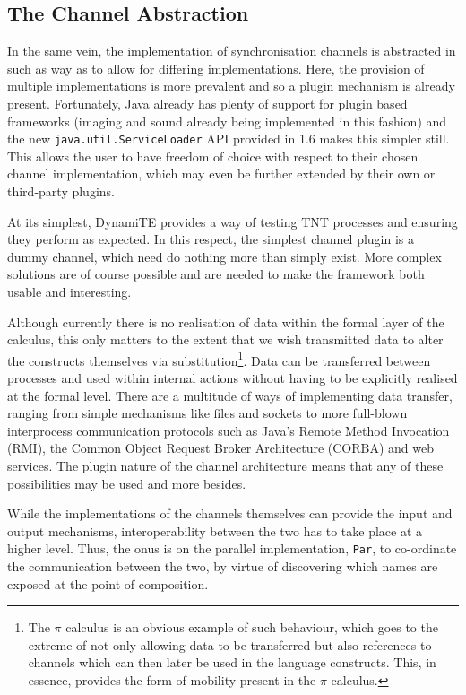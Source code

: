 \documentclass{sig-alternate}
\begin{document}
\subsection{The Channel Abstraction}
\label{channels}

In the same vein, the implementation of synchronisation channels is
abstracted in such as way as to allow for differing implementations.
Here, the provision of multiple implementations is more prevalent and so
a plugin mechanism is already present.  Fortunately, Java already has
plenty of support for plugin based frameworks (imaging and sound already
being implemented in this fashion) and the new
\texttt{java.util.ServiceLoader} API provided in 1.6 makes this simpler
still.  This allows the user to have freedom of choice with respect to
their chosen channel implementation, which may even be further extended
by their own or third-party plugins.

At its simplest, DynamiTE provides a way of testing TNT processes and
ensuring they perform as expected.  In this respect, the simplest
channel plugin is a dummy channel, which need do nothing more than
simply exist.  More complex solutions are of course possible and are
needed to make the framework both usable and interesting.  

Although currently there is no realisation of data within the formal
layer of the calculus, this only matters to the extent that we wish
transmitted data to alter the constructs themselves via
substitution\footnote{The $\pi$ calculus \cite{picalctutorial} is an
obvious example of such behaviour, which goes to the extreme of not only
allowing data to be transferred but also references to channels which
can then later be used in the language constructs.  This, in essence,
provides the form of mobility present in the $\pi$ calculus.}.  Data can
be transferred between processes and used within internal actions
without having to be explicitly realised at the formal level.  There are
a multitude of ways of implementing data transfer, ranging from simple
mechanisms like files and sockets to more full-blown interprocess
communication protocols such as Java's Remote Method Invocation (RMI),
the Common Object Request Broker Architecture (CORBA) and web services.
The plugin nature of the channel architecture means that any of these
possibilities may be used and more besides.

While the implementations of the channels themselves can provide the
input and output mechanisms, interoperability between the two has to
take place at a higher level.  Thus, the onus is on the parallel
implementation, \texttt{Par}, to co-ordinate the communication between
the two, by virtue of discovering which names are exposed at the point
of composition.
\end{document}
